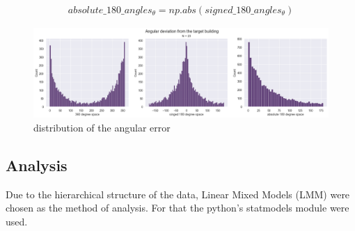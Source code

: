 \begin{enumerate}
\begin{enumerate}
		\begin{align*}
			absolute\_180\_angles_{\theta} = np.abs(signed\_180\_angles_{\theta})
		\end{align*}
		
	\end{enumerate}
\end{enumerate}

\begin{figure}[h]
	\centering
	\includegraphics[width=150mm]{figures/angular_diff_dist_23.png}
	\caption[Distribution of the angular error]{distribution of the angular error}
	\label{fig:angular_dev_dists}
\end{figure}

\subsection{Analysis}
Due to the hierarchical structure of the data, Linear Mixed Models (LMM) were chosen as the method of analysis. For that the python's statmodels module were used.


